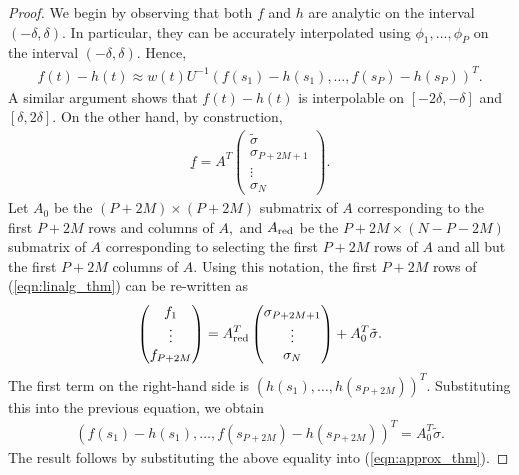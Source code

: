 \begin{proof}
We begin by observing that both $f$ and $h$ are analytic on the interval $(-\delta,\delta).$ In particular, they can be accurately interpolated using $\phi_1,\dots,\phi_P$ on the interval $(-\delta,\delta).$ Hence,
\begin{align}\label{eqn:approx_thm}
f(t)-h(t) \approx w(t) U^{-1} (f(s_1)-h(s_1),\dots,f(s_P)-h(s_P))^T.
\end{align}
{\color{red}A similar argument shows that $f(t)-h(t)$ is interpolable on $[-2\delta,-\delta]$ and $[\delta,2\delta].$}
On the other hand, by construction,
\begin{align}\label{eqn:linalg_thm}
\underline{f} = A^T \begin{pmatrix}\tilde{\sigma}\\ \sigma_{P+{2M+1}}\\ \vdots\\ \sigma_N\end{pmatrix}.
\end{align}
Let $A_0$ be the $(P+2M)\times (P+2M)$ submatrix of $A$ corresponding to the first $P+2M$ rows and columns of $A,$ and $A_{\rm red}$ be the $P+2M \times (N-P-2M)$  submatrix of $A$ corresponding to selecting the first $P+2M$ rows of $A$ and all but the first $P+2M$ columns of $A.$ Using this notation, the first $P+2M$ rows of (\ref{eqn:linalg_thm}) can be re-written as
\begin{align}
\begin{pmatrix}f_1\\\vdots \\ f_{P+2M}\end{pmatrix}  = A_{\rm red}^T \begin{pmatrix} \sigma_{P+2M+1}\\ \vdots\\ \sigma_N\end{pmatrix} + A_0^T \tilde{\sigma}.
\end{align}
The first term on the right-hand side is $(h(s_1),\dots,h(s_{P+2M}))^T.$ Substituting this into the previous equation, we obtain
\begin{align}
(f(s_1)-h(s_1),\dots,f(s_{P+2M})-h(s_{P+2M}))^T = A_0^T \tilde{\sigma}.
\end{align}
The result follows by substituting the above equality into (\ref{eqn:approx_thm}).
\end{proof}

